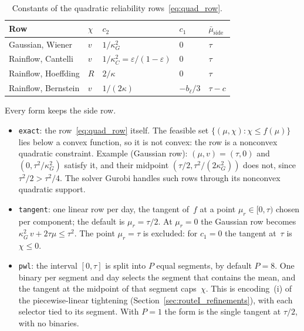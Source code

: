 \documentclass[11pt,a4paper]{article}
\theoremstyle{plain}
\theoremstyle{definition}
\theoremstyle{remark}
\begin{document}
\begin{table}[htbp]
\centering
\caption{Constants of the quadratic reliability rows~\eqref{eq:quad_row}.}
\label{tab:quad_constants}
\small
\begin{tabular}{@{}lllll@{}}
\toprule
\textbf{Row} & $\chi$ & $c_2$ & $c_1$ & $\bar\mu_{\mathrm{side}}$ \\
\midrule
Gaussian, Wiener   & $v$ & $1/\kappa_G^2$ & $0$ & $\tau$ \\
Rainflow, Cantelli & $v$ & $1/\kappa_C^2 = \varepsilon/(1-\varepsilon)$ & $0$ & $\tau$ \\
Rainflow, Hoeffding & $R$ & $2/\kappa$ & $0$ & $\tau$ \\
Rainflow, Bernstein & $v$ & $1/(2\kappa)$ & $-b_\ell/3$ & $\tau - c$ \\
\bottomrule
\end{tabular}
\end{table}

Every form keeps the side row.
\begin{itemize}
  \item \texttt{exact}: the row~\eqref{eq:quad_row} itself.
    The feasible set $\{(\mu, \chi) : \chi \le f(\mu)\}$ lies below a convex function, so it is not convex: the row is a nonconvex quadratic constraint.
    Example (Gaussian row): $(\mu, v) = (\tau, 0)$ and $(0, \tau^2/\kappa_G^2)$ satisfy it, and their midpoint $(\tau/2, \tau^2/(2\kappa_G^2))$ does not, since $\tau^2/2 > \tau^2/4$.
    The solver Gurobi handles such rows through its nonconvex quadratic support.
  \item \texttt{tangent}: one linear row per day, the tangent of~$f$ at a point $\mu_r \in [0, \tau)$ chosen per component; the default is $\mu_r = \tau/2$.
    At $\mu_r = 0$ the Gaussian row becomes $\kappa_G^2\, v + 2\tau\mu \le \tau^2$.
    The point $\mu_r = \tau$ is excluded: for $c_1 = 0$ the tangent at~$\tau$ is $\chi \le 0$.
  \item \texttt{pwl}: the interval $[0, \tau]$ is split into $P$ equal segments, by default $P = 8$.
    One binary per segment and day selects the segment that contains the mean, and the tangent at the midpoint of that segment caps~$\chi$.
    This is encoding~(i) of the piecewise-linear tightening (Section~\ref{sec:routeI_refinements}), with each selector tied to its segment.
    With $P = 1$ the form is the single tangent at $\tau/2$, with no binaries.
\end{itemize}
\end{document}

